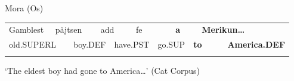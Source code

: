 \begin{listWWNumileveli}
\item {}

\begin{styleExample}
\label{bkm:Ref135470190}Mora (Os)

\end{styleExample}

\end{listWWNumileveli}

\begin{listWWNumlxxxviileveli}
\item {}

\end{listWWNumlxxxviileveli}

\begin{tabular}{llllllllllll}
\lsptoprule
Gamblest & \multicolumn{2}{l}{påjtsen

} & \multicolumn{2}{l}{add

} & \multicolumn{2}{l}{fe

} & \multicolumn{2}{l}{{\bfseries a}

} & \multicolumn{2}{l}{{\bfseries Merikun…}

} & \\
\multicolumn{2}{l}{old.SUPERL

} & \multicolumn{2}{l}{boy.DEF

} & \multicolumn{2}{l}{have.PST

} & \multicolumn{2}{l}{go.SUP

} & \multicolumn{2}{l}{{\bfseries to}

} & \multicolumn{2}{l}{{\bfseries America.DEF}

}\\
\lspbottomrule
\end{tabular}

\begin{styleTranslation}
‘The eldest boy had gone to America…’ (Cat Corpus)

\end{styleTranslation}

